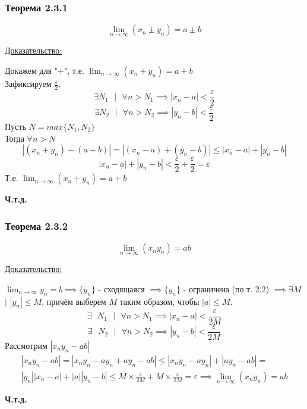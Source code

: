 \documentclass[12pt]{article}
\def\posl#1#2{\{#1_{#2}\}}
\begin{document}
    \subsubsection*{Теорема 2.3.1}\label{th:2.3.1}
    \[\lim_{n\to\infty}(x_n \pm y_n) = a \pm b\]\par\noindent
    \underline{Доказательство:}\par
    \begin{adjustwidth}{1.5em}{1.5em}
        Докажем для "+", т.е. $\lim_{n\to\infty} (x_n + y_n) = a + b$\\
        Зафиксируем $\frac{\varepsilon}{2}$.\\
        \[\exists N_{1} \text{ } \big| \text{ } \forall n > N_{1} \implies |x_n - a| < \frac{\varepsilon}{2}\]
        \[\exists N_{2} \text{ } \big| \text{ } \forall n > N_{2} \implies |y_n - b| < \frac{\varepsilon}{2}\]
        Пусть $N = max\{N_{1},N_{2}\}$\\
        Тогда $\forall n > N$ 
        \[|(x_n + y_n) - (a+b)| = |(x_n - a) + (y_n - b)| \le |x_n - a| + |y_n - b|\]
        \[|x_n - a| + |y_n - b| < \frac{\varepsilon}{2} + \frac{\varepsilon}{2} = \varepsilon\]
        Т.е. $\lim_{n\to\infty} (x_n + y_n) = a + b$
        \begin{center}
            \textbf{Ч.т.д.}
        \end{center}
    \end{adjustwidth}
    
    \subsubsection*{Теорема 2.3.2}\label{th:2.3.2}
    \[\lim_{n\to\infty}(x_ny_n) = ab\]\par\noindent
    \underline{Доказательство:}\par
    \begin{adjustwidth}{1.5em}{1.5em}
        $\lim_{n\to\infty}y_n = b \implies \posl{y}{n}$ - сходящаяся $\implies \posl{y}{n}$ - ограничена (по т. 2.2) $\implies \exists M$ $\big|$ $|y_n| \le M$, причём выберем $M$ таким образом, чтобы $|a| \le M$.\\
        \[ \exists \text{ } N_{1} \text{ } \big| \text{ } \forall n > N_{1} \implies |x_n - a| < \frac{\varepsilon}{2M} \]
        \[ \exists \text{ } N_{2} \text{ } \big| \text{ } \forall n > N_{2} \implies |y_n - b| < \frac{\varepsilon}{2M} \]
        Рассмотрим $|x_ny_n-ab|$
        \begin{gather*}
            |x_ny_n-ab| = |x_ny_n - ay_n + ay_n - ab| \le |x_ny_n - ay_n| + |ay_n - ab| =\\
            |y_n||x_n-a| + |a||y_n - b| \le M \times \frac{\varepsilon}{2M} + M \times \frac{\varepsilon}{2M} = \varepsilon \implies \lim_{n\to\infty} (x_ny_n) = ab
        \end{gather*}
        \begin{center}
            \textbf{Ч.т.д.}
        \end{center}
    \end{adjustwidth}
\end{document}
